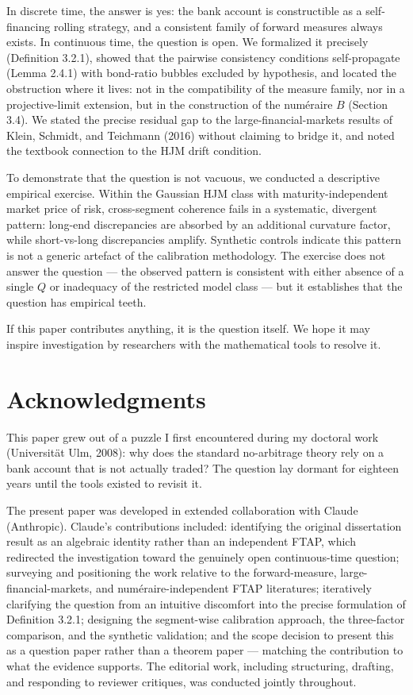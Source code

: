 \documentclass[
]{article}
\begin{document}
In discrete time, the answer is yes: the bank account is constructible
as a self-financing rolling strategy, and a consistent family of forward
measures always exists. In continuous time, the question is open. We
formalized it precisely (Definition 3.2.1), showed that the pairwise
consistency conditions self-propagate (Lemma 2.4.1) with bond-ratio
bubbles excluded by hypothesis, and located the obstruction where it
lives: not in the compatibility of the measure family, nor in a
projective-limit extension, but in the construction of the numéraire
\(B\) (Section 3.4). We stated the precise residual gap to the
large-financial-markets results of Klein, Schmidt, and Teichmann (2016)
without claiming to bridge it, and noted the textbook connection to the
HJM drift condition.

To demonstrate that the question is not vacuous, we conducted a
descriptive empirical exercise. Within the Gaussian HJM class with
maturity-independent market price of risk, cross-segment coherence fails
in a systematic, divergent pattern: long-end discrepancies are absorbed
by an additional curvature factor, while short-vs-long discrepancies
amplify. Synthetic controls indicate this pattern is not a generic
artefact of the calibration methodology. The exercise does not answer
the question --- the observed pattern is consistent with either absence
of a single \(Q\) or inadequacy of the restricted model class --- but it
establishes that the question has empirical teeth.

If this paper contributes anything, it is the question itself. We hope
it may inspire investigation by researchers with the mathematical tools
to resolve it.

\section{Acknowledgments}\label{acknowledgments}

This paper grew out of a puzzle I first encountered during my doctoral
work (Universität Ulm, 2008): why does the standard no-arbitrage theory
rely on a bank account that is not actually traded? The question lay
dormant for eighteen years until the tools existed to revisit it.

The present paper was developed in extended collaboration with Claude
(Anthropic). Claude's contributions included: identifying the original
dissertation result as an algebraic identity rather than an independent
FTAP, which redirected the investigation toward the genuinely open
continuous-time question; surveying and positioning the work relative to
the forward-measure, large-financial-markets, and numéraire-independent
FTAP literatures; iteratively clarifying the question from an intuitive
discomfort into the precise formulation of Definition 3.2.1; designing
the segment-wise calibration approach, the three-factor comparison, and
the synthetic validation; and the scope decision to present this as a
question paper rather than a theorem paper --- matching the contribution
to what the evidence supports. The editorial work, including
structuring, drafting, and responding to reviewer critiques, was
conducted jointly throughout.
\end{document}
